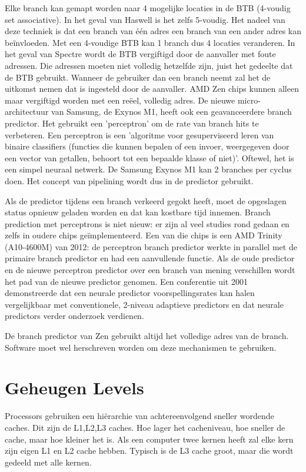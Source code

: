 Elke branch kan gemapt worden naar 4 mogelijke locaties in de BTB (4-voudig set associative).
In het geval van Haswell is het zelfs 5-voudig.
Het nadeel van deze techniek is dat een branch van één adres een branch van een ander adres kan beïnvloeden. Met een 4-voudige BTB kan 1 branch dus 4 locaties veranderen. In het geval van Spectre wordt de BTB vergiftigd door de aanvaller met foute adressen. Die adressen moeten niet volledig hetzelfde zijn, juist het gedeelte dat de BTB gebruikt. Wanneer de gebruiker dan een branch neemt zal het de uitkomst nemen dat is ingesteld door de aanvaller. AMD Zen chips kunnen alleen maar vergiftigd worden met een reëel, volledig adres.
De nieuwe micro-architectuur van Samsung, de Exynos M1, heeft ook een geavanceerdere branch predictor. Het gebruikt een 'perceptron' om de rate van branch hits te verbeteren.
Een perceptron is een 'algoritme voor gesuperviseerd leren van binaire classifiers (functies die kunnen bepalen of een invoer, weergegeven door een vector van getallen, behoort tot een bepaalde klasse of niet)'.\parencite{Freund1999}
Oftewel, het is een simpel neuraal netwerk. 
De Samsung Exynos M1 kan 2 branches per cyclus doen. Het concept van pipelining wordt dus in de predictor gebruikt.

Als de predictor tijdens een branch verkeerd gegokt heeft, moet de opgeslagen status opnieuw geladen worden en dat kan kostbare tijd innemen.
Branch prediction met perceptrons is niet nieuw: er zijn al veel studies rond gedaan en zelfs in oudere chips geïmplementeerd. Een van die chips is een AMD Trinity (A10-4600M) van 2012: de perceptron branch predictor werkte in parallel met de primaire branch predictor en had een aanvullende functie. 
Als de oude predictor en de nieuwe perceptron predictor over een branch van mening verschillen wordt het pad van de nieuwe predictor genomen.
Een conferentie uit 2001 demonstreerde dat een neurale predictor voorspellingsrates kan halen vergelijkbaar met conventionele, 2-niveau adaptieve predictors en dat neurale predictors verder onderzoek verdienen. \parencite{Steven2001}


De branch predictor van Zen gebruikt altijd het volledige adres van de branch.
Software moet wel herschreven worden om deze mechanismen te gebruiken.

\parencite{Intel2018}

\section{Geheugen Levels}
Processors gebruiken een hiërarchie van achtereenvolgend sneller wordende caches. Dit zijn de L1,L2,L3 caches.
Hoe lager het cacheniveau, hoe sneller de cache, maar hoe kleiner het is. Als een computer twee kernen heeft zal elke kern zijn eigen L1 en L2 cache hebben. Typisch is de L3 cache groot, maar die wordt gedeeld met alle kernen.

